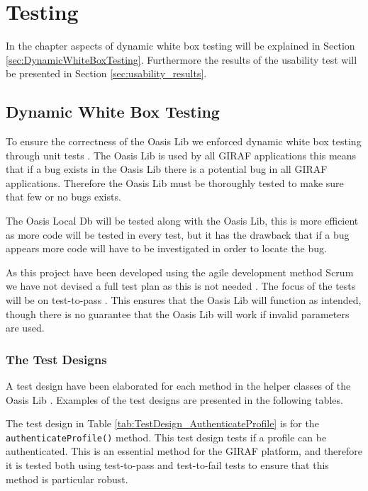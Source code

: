 \chapter{Testing}
In the chapter aspects of dynamic white box testing will be explained in Section \vref{sec:DynamicWhiteBoxTesting}.
Furthermore the results of the usability test will be presented in Section \vref{sec:usability_results}.

\section{Dynamic White Box Testing}
\label{sec:DynamicWhiteBoxTesting}
To ensure the correctness of the Oasis Lib we enforced dynamic white box testing through unit tests \cite[pp106]{Testing, UnitTesting}.
The Oasis Lib is used by all GIRAF applications this means that if a bug exists in the Oasis Lib there is a potential bug in all GIRAF applications.
Therefore the Oasis Lib must be thoroughly tested to make sure that few or no bugs exists.

The Oasis Local Db will be tested along with the Oasis Lib, this is more efficient as more code will be tested in every test, but it has the drawback that if a bug appears more code will have to be investigated in order to locate the bug.

As this project have been developed using the agile development method Scrum we have not devised a full test plan as this is not needed \cite[pp263]{Testing}. 
The focus of the tests will be on test-to-pass \cite[pp66]{Testing}.
This ensures that the Oasis Lib will function as intended, though there is no guarantee that the Oasis Lib will work if invalid parameters are used.

\subsection{The Test Designs}
\label{sec:testDesign}
A test design have been elaborated for each method in the helper classes of the Oasis Lib \cite[pp281]{Testing}.
Examples of the test designs are presented in the following tables.

The test design in Table \vref{tab:TestDesign_AuthenticateProfile} is for the \texttt{authenticateProfile()} method.
This test design tests if a profile can be authenticated.
This is an essential method for the GIRAF platform, and therefore it is tested both using test-to-pass and test-to-fail tests to ensure that this method is particular robust.

